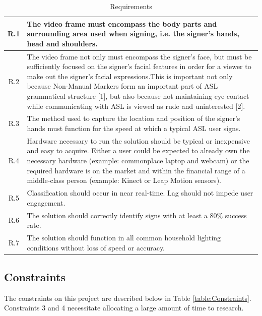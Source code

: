 \documentclass[12pt]{article}
\begin{document}
\begin{table}[h!]
\centering
\caption{Requirements}
\label{table:Requirements}
\vspace{1em}
\begin{tabular}{|c| p{14cm} |}
	\hline
	R.1 & The video frame must encompass the body parts and surrounding area used when signing, i.e. the signer’s hands, head and shoulders. \\ \hline
	R.2 & The video frame not only must encompass the signer’s face, but must be sufficiently focused on the signer’s facial features in order for a viewer to make out the signer’s facial expressions.This is important not only because Non-Manual Markers form an important part of ASL grammatical structure [1], but also because not maintaining eye contact while communicating with ASL is viewed as rude and uninterested [2]. \\ \hline
	R.3 & The method used to capture the location and position of the signer’s hands must function for the speed at which a typical ASL user signs. \\ \hline
	R.4 & Hardware necessary to run the solution should be typical or inexpensive and easy to acquire. Either a user could be expected to already own the necessary hardware (example: commonplace laptop and webcam) or the required hardware is on the market and within the financial range of a middle-class person (example: Kinect or Leap Motion sensors). \\ \hline
	R.5 & Classification should occur in near real-time. Lag should not impede user engagement. \\ \hline
	R.6 & The solution should correctly identify signs with at least a 80\% success rate. \\ \hline
	R.7 & The solution should function in all common household lighting conditions without loss of speed or accuracy. \\ \hline
\end{tabular}
\end{table}

\subsection{Constraints}
The constraints on this project are described below in Table \ref{table:Constraints}. Constraints 3 and 4 necessitate allocating a large amount of time to research.
\end{document}
